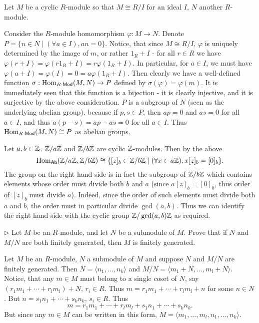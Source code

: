 \begin{solution}
	Let $M$ be a cyclic $R$-module so that $M \cong R/I$ for an ideal $I$, $N$ another $R$-module.
	
	Consider the $R$-module homomorphism $\varphi: M \to N$. Denote $P = \{ n \in N \mid (\forall a \in I), an = 0 \}$. Notice, that since $M \cong R/I$, $\varphi$ is uniquely determined by the image of $m$, or rather $1_R + I$ - for all $r \in R$ we have $\varphi(r + I) = \varphi(r 1_R + I) = r \varphi(1_R + I)$. In particular, for $a \in I$, we must have $\varphi(a + I) = \varphi(I) = 0 = a \varphi(1_R + I)$. Then clearly we have a well-defined function $\sigma: \mathrm{Hom}_{R\text{-}\mathsf{Mod}}(M, N) \to P$ defined by $\sigma(\varphi) = \varphi(m)$. It is immediately seen that this function is a bijection - it is clearly injective, and it is surjective by the above consideration. $P$ is a subgroup of $N$ (seen as the underlying abelian group), because if $p, s \in P$, then $ap = 0$ and $as = 0$ for all $a \in I$, and thus $a(p - s) = ap - as = 0$ for all $a \in I$. Thus $\mathrm{Hom}_{R\text{-}\mathsf{Mod}}(M, N) \cong P$ as abelian groups.
	
	Let $a, b \in \mathbb{Z}$. $\mathbb{Z}/a\mathbb{Z}$ and $\mathbb{Z}/b\mathbb{Z}$ are cyclic $\mathbb{Z}$-modules. Then by the above
	\[
		\mathrm{Hom}_{\mathsf{Ab}}(\mathbb{Z}/a\mathbb{Z}, \mathbb{Z}/b\mathbb{Z}) \cong \{ [z]_b \in \mathbb{Z}/b\mathbb{Z} \mid (\forall x \in a\mathbb{Z}), x [z]_b = [0]_b \} \text{.}
	\]
	The group on the right hand side is in fact the subgroup of $\mathbb{Z}/b\mathbb{Z}$ which contains elements whose order must divide both $b$ and $a$ (since $a[z]_b = [0]_b$, thus order of $[z]_b$ must divide $a$). Indeed, since the order of such elements must divide both $a$ and $b$, the order must in particular divide $\gcd(a, b)$. Thus we can identify the right hand side with the cyclic group $\mathbb{Z}/\gcd(a, b)\mathbb{Z}$ as required.
\end{solution}

\begin{problem}
	$\triangleright$ Let $M$ be an $R$-module, and let $N$ be a submodule of $M$. Prove that if $N$ and $M/N$ are both finitely generated, then $M$ is finitely generated.
\end{problem}

\begin{solution}
	Let $M$ be an $R$-module, $N$ a submodule of $M$ and suppose $N$ and $M/N$ are finitely generated. Then $N = \langle n_1, \dots, n_k \rangle$ and $M/N = \langle m_1 + N, \dots, m_l + N \rangle$. Notice, that any $m \in M$ must belong to a single coset of $N$, say $(r_1 m_1 + \cdots + r_l m_l) + N$, $r_i \in R$. Thus $m = r_1 m_1 + \cdots + r_l m_l + n$ for some $n \in N$. But $n = s_1 n_1 + \cdots + s_k n_k$, $s_i \in R$. Thus
	\[
		m = r_1 m_1 + \cdots + r_l m_l + s_1 n_1 + \cdots + s_k n_k \text{.}
	\]
	But since any $m \in M$ can be written in this form, $M = \langle m_1, \dots, m_l, n_1, \dots, n_k \rangle$.
\end{solution}

